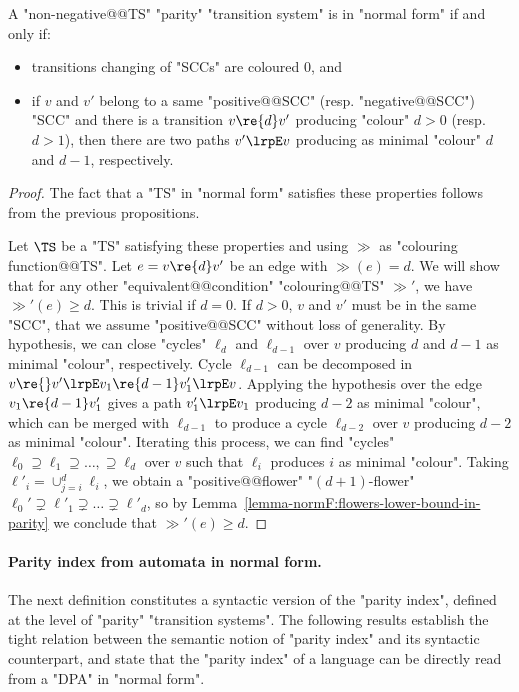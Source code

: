 \documentclass{theoretics}
\begin{document}
\begin{theorem}\label{th-normF:charactNormForm}
	A "non-negative@@TS" "parity" "transition system" is in "normal form" if and only if:
	\begin{itemize}
		\item transitions changing of "SCCs" are coloured  $0$, and
		\item if $v$ and $v'$ belong to a same "positive@@SCC" (resp. "negative@@SCC") "SCC" and there is a transition $v\re{d} v'$ producing "colour" $d>0$ (resp. $d>1$), then there are two paths  $v'\lrpE v$ producing as minimal "colour" $d$ and $d-1$, respectively.
	\end{itemize}
\end{theorem}
\begin{proof}
	The fact that a "TS" in "normal form" satisfies these properties follows from the previous propositions.
	
	Let $\TS$ be a "TS" satisfying these properties and using $\gg$ as "colouring function@@TS". Let $e=v\re{d}v'$ be an edge with $\gg(e)=d$. We will show that for any other "equivalent@@condition" "colouring@@TS" $\gg'$, we have $\gg'(e)\geq d$. 
	This is trivial if $d=0$.
	If $d>0$, $v$ and $v'$ must be in the same "SCC", that we assume "positive@@SCC" without loss of generality.
	By hypothesis, we can close "cycles" $\ell_d$ and $\ell_{d-1}$ over $v$ producing $d$ and $d-1$ as minimal "colour", respectively. 
	Cycle $\ell_{d-1}$ can be decomposed in $v\re{} v'\lrpE v_1 \re{d-1}v_1' \lrpE v$. Applying the hypothesis over the edge  $v_1 \re{d-1}v_1'$ gives a path $v_1'\lrpE v_1$ producing $d-2$ as minimal "colour", which can be merged with 
	$\ell_{d-1}$ to produce a cycle $\ell_{d-2}$ over $v$ producing $d-2$ as minimal "colour".
	Iterating this process, we can find "cycles" $\ell_0\supseteq \ell_1\supseteq\dots, \supseteq \ell_{d}$ over $v$ such that $\ell_i$ produces $i$ as minimal "colour". 
	Taking $\ell'_i = \cup_{j=i}^d\ell_i$, we obtain a "positive@@flower" "$(d+1)$-flower" $\ell_0'\supsetneq\ell'_1\supsetneq\dots \supsetneq \ell'_d$, so by Lemma~\ref{lemma-normF:flowers-lower-bound-in-parity} we conclude that $\gg'(e)\geq d$.
\end{proof}


\paragraph*{Parity index from automata in normal form.}

The next definition constitutes a syntactic version of the "parity index", defined at the level of "parity" "transition systems". 
The following results establish the tight relation between the semantic notion of "parity index" and its syntactic counterpart, and state that the "parity index" of a language can be directly read from a "DPA" in "normal form".
\end{document}
